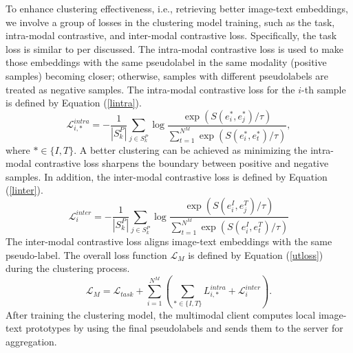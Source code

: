 To enhance clustering effectiveness, i.e., retrieving better image-text embeddings, we involve a group of losses in the clustering model training, such as the task, intra-modal contrastive, and inter-modal contrastive loss.
Specifically, the task loss is similar to per discussed. 
The intra-modal contrastive loss is used to make those embeddings with the same pseudolabel in the same modality (positive samples) becoming closer; otherwise, samples with different pseudolabels are treated as negative samples. 
The intra-modal contrastive loss for the $i$-th sample is defined by Equation (\ref{lintra}).
\begin{equation}\label{lintra}
    \mathcal L^{intra}_{i,*}=-\frac{1}{|S_k^P|}\sum_{j\in S_k^P}\log \frac{\exp (S(e_i^*,e_j^*)/\tau)}{\sum_{t=1}^{N^M}\exp (S(e_i^*,e_t^*)/\tau) },
\end{equation}
where $*\in\{I,T\}$. 
A better clustering can be achieved as minimizing the intra-modal contrastive loss sharpens the boundary between positive and negative samples.
In addition, the inter-modal contrastive loss is defined by Equation (\ref{linter}).
\begin{equation}\label{linter}
    \mathcal L^{inter}_i=-\frac{1}{|S_k^P|}\sum_{j\in S_k^P}\log \frac{\exp (S(e_i^I,e_j^T)/\tau)}{\sum_{t=1}^{N^M}\exp (S(e_i^I,e_t^T)/\tau) }
\end{equation}
The inter-modal contrastive loss aligns image-text embeddings with the same pseudo-label. 
The overall loss function $\mathcal L_M$ is defined by Equation (\ref{utloss}) during the clustering process.
\begin{equation}\label{utloss}
    \mathcal L_M = \mathcal L_{task}+\sum_{i=1}^{N^M}(\sum_{*\in\{I,T\}} L^{intra}_{i,*}+\mathcal L^{inter}_i).
\end{equation}
After training the clustering model, the multimodal client computes local image-text prototypes by using the final pseudolabels and sends them to the server for aggregation.


